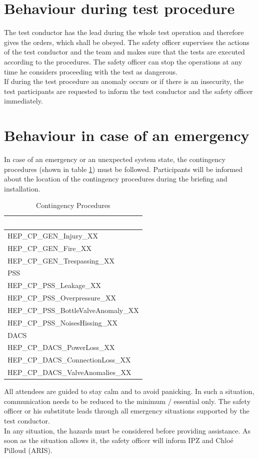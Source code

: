 \documentclass{article}
\begin{document}
\section{Behaviour during test procedure}
The test conductor has the lead during the whole test operation and therefore gives the orders, which shall be obeyed. The safety officer supervises the actions of the test conductor and the team and makes sure that the tests are executed according to the procedures. The safety officer can stop the operations at any time he considers proceeding with the test as dangerous. \\
\noindent
If during the test procedure an anomaly occurs or if there is an insecurity, the test participants are requested to inform the test conductor and the safety officer immediately.
\newpage
\section{Behaviour in case of an emergency} \label{emergency-behaviour}
In case of an emergency or an unexpected system state, the contingency procedures (shown in table \ref{tab:contingency-procedures}) must be followed. Participants will be informed about the location of the contingency procedures during the briefing and installation.
\begin{table}[h]
    \caption{Contingency Procedures}
    \label{tab:contingency-procedures}
    \begin{tabularx}{0.9\textwidth}{|X|}
        \cellcolor{blue} \textcolor{white}{General} \\ \hline
        HEP\_CP\_GEN\_Injury\_XX \\ \hline
        HEP\_CP\_GEN\_Fire\_XX \\ \hline
        HEP\_CP\_GEN\_Trespassing\_XX \\ \hline
        \cellcolor{orange} PSS \\ \hline
        HEP\_CP\_PSS\_Leakage\_XX \\ \hline
        HEP\_CP\_PSS\_Overpressure\_XX \\ \hline
        HEP\_CP\_PSS\_BottleValveAnomaly\_XX \\ \hline
        HEP\_CP\_PSS\_NoisesHissing\_XX \\ \hline
        \cellcolor{yellow} DACS \\ \hline
        HEP\_CP\_DACS\_PowerLoss\_XX \\ \hline
        HEP\_CP\_DACS\_ConnectionLoss\_XX \\ \hline
        HEP\_CP\_DACS\_ValveAnomalies\_XX \\ \hline
    \end{tabularx}
\end{table}
All attendees are guided to stay calm and to avoid panicking. In such a situation, communication needs to be reduced to the minimum / essential only. The safety officer or his substitute leads through all emergency situations supported by the test conductor. \\
\noindent
In any situation, the hazards must be considered before providing assistance.
\noindent
As soon as the situation allows it, the safety officer will inform IPZ and Chloé Pilloud (ARIS). 
\end{document}
